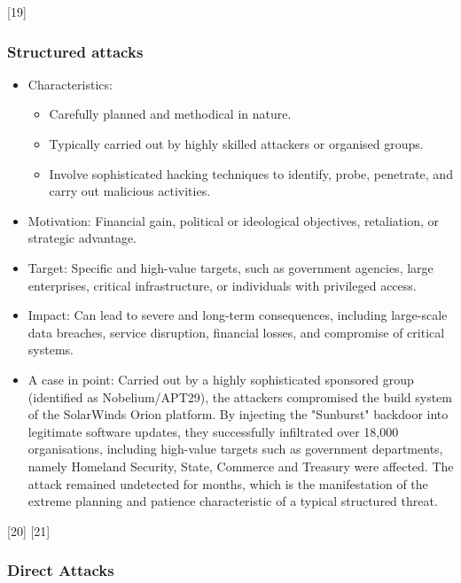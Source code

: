 [19]

\subsubsection{Structured attacks}

\begin{itemize}
  \item Characteristics:
  \begin{itemize}
    \item Carefully planned and methodical in nature.
    \item Typically carried out by highly skilled attackers or organised groups.
    \item Involve sophisticated hacking techniques to identify, probe, penetrate, and carry out malicious activities.
  \end{itemize}
  \item Motivation: Financial gain, political or ideological objectives, retaliation, or strategic advantage.
  \item Target: Specific and high-value targets, such as government agencies, large enterprises, critical infrastructure, or individuals with privileged access.
  \item Impact: Can lead to severe and long-term consequences, including large-scale data breaches, service disruption, financial losses, and compromise of critical systems.
  \item A case in point: Carried out by a highly sophisticated sponsored group (identified as Nobelium/APT29), the attackers compromised the build system of the SolarWinds Orion platform. By injecting the "Sunburst" backdoor into legitimate software updates, they successfully infiltrated over 18,000 organisations, including high-value targets such as government departments, namely Homeland Security, State, Commerce and Treasury were affected. The attack remained undetected for months, which is the manifestation of the extreme planning and patience characteristic of a typical structured threat.
\end{itemize}

[20] [21]

\subsubsection{Direct Attacks}

